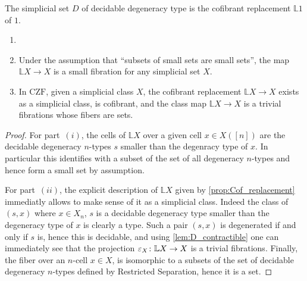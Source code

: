 \documentclass[reqno,10pt,a4paper,oneside,draft]{amsart}
\begin{document}
\begin{corollary}
The simplicial set $D$ of decidable degeneracy type is the cofibrant replacement $\mathbb{L} 1$ of $1$.
\end{corollary}

\begin{corollary} \label{cor:cofibrant_smallness}
\begin{enumerate}[$(i)$]

\item[]
 
\item Under the assumption that ``subsets of small sets are small sets'', the map $\mathbb{L} X \rightarrow X$ is a small fibration for any simplicial set $X$.

\item In $\mathrm{CZF}$, given a simplicial class $X$, the cofibrant replacement $\mathbb{L} X \rightarrow X$ exists as a simplicial class, is cofibrant, and the class map $\mathbb{L} X \rightarrow X$ is a trivial fibrations whose fibers are sets.

\end{enumerate}
\end{corollary}

\begin{proof}

For part~$(i)$, the cells of $\mathbb{L} X$ over a given cell $x \in X([n])$ are the decidable degeneracy $n$-types $s$ smaller than the degenracy type of $x$. In particular this identifies with a subset of the set of all degeneracy $n$-types and hence form a small set by assumption.

For part~$(ii)$, the explicit description of $\mathbb{L} X$ given by \cref{prop:Cof_replacement} immediatly allows to make sense of it as a simplicial class. Indeed the class of $(s,x)$ where $x\in X_n$, $s$ is a decidable degeneracy type smaller than the degeneracy type of $x$ is clearly a type. Such a pair $(s,x)$ is degenerated if and only if $s$ is, hence this is decidable, and using \cref{lem:D_contractible} one can immediately see that the projection $\varepsilon_X \colon \mathbb{L} X \rightarrow X$ is a trivial fibrations. Finally, the fiber over an $n$-cell $x \in X$, is isomorphic to a subsets of the set of decidable degeneracy $n$-types defined by Restricted Separation, hence it is a set.
\end{proof}





\end{document}

